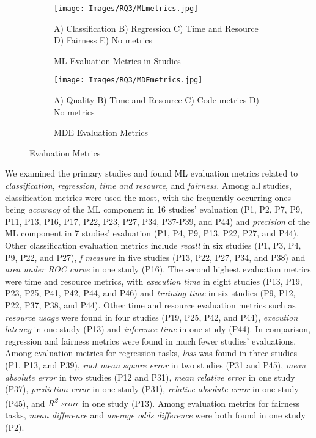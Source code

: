 \begin{figure}[htbp]
    \centering
    \begin{subfigure}{0.49\textwidth}
    \texttt{[image: Images/RQ3/MLmetrics.jpg]}
    \caption{ML Evaluation Metrics in Studies}
          \begin{center}{\footnotesize A) Classification B) Regression C) Time and Resource D) Fairness E) No metrics} \end{center}
    \label{fig:MLmetrics}
    \vspace*{-0.3em}

    \end{subfigure}
\hfill
    \begin{subfigure}{0.49\textwidth}
    \centering
    \texttt{[image: Images/RQ3/MDEmetrics.jpg]}
    \caption{MDE Evaluation Metrics}
     \begin{center}{ \footnotesize A) Quality B) Time and Resource C) Code metrics D) No metrics}\end{center}
    \label{fig:MDEmetrics}
\end{subfigure}
\caption{Evaluation Metrics}
\end{figure}

We examined the primary studies and found ML evaluation metrics related to \textit{classification}, \textit{regression}, \textit{time and resource}, and \textit{fairness}. Among all studies, classification metrics were used the most, with the frequently occurring ones being \textit{accuracy} of the ML component in 16 studies' evaluation (P1, P2, P7, P9, P11, P13, P16, P17, P22, P23, P27, P34, P37-P39, and P44) and \textit{precision} of the ML component in 7 studies' evaluation (P1, P4, P9, P13, P22, P27, and P44). Other classification evaluation metrics include \textit{recall} in six studies (P1, P3, P4, P9, P22, and P27), \textit{f measure} in five studies (P13, P22, P27, P34, and P38) and \textit{area under ROC curve} in one study (P16). The second highest evaluation metrics were time and resource metrics, with \textit{execution time} in eight studies (P13, P19, P23, P25, P41, P42, P44, and P46) and \textit{training time} in six studies (P9, P12, P22, P37, P38, and P44). Other time and resource evaluation metrics such as \textit{resource usage} were found in four studies (P19, P25, P42, and P44), \textit{execution latency} in one study (P13) and \textit{inference time} in one study (P44). In comparison, regression and fairness metrics were found in much fewer studies' evaluations. Among evaluation metrics for regression tasks, \textit{loss} was found in three studies (P1, P13, and P39), \textit{root mean square error} in two studies (P31 and P45), \textit{mean absolute error} in two studies (P12 and P31), \textit{mean relative error} in one study (P37), \textit{prediction error} in one study (P31),  \textit{relative absolute error} in one study (P45), and \textit{R\textsuperscript{2} score} in one study (P13). Among evaluation metrics for fairness tasks, \textit{mean difference} and \textit{average odds difference} were both found in one study (P2).

